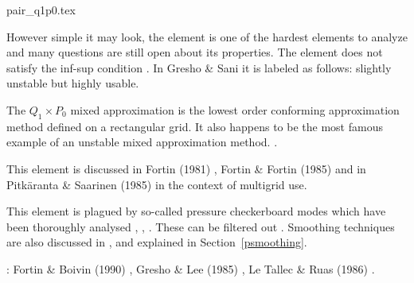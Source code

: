 \begin{flushright} {\tiny {\color{gray} pair\_q1p0.tex}} \end{flushright}


\begin{minipage}{0.48\textwidth}
\begin{center}

\end{center}
\end{minipage}
\begin{minipage}{0.48\textwidth}
\begin{center}

\end{center}
\end{minipage}

However simple it may look, the  element is 
one of the hardest elements to analyze and many questions are still open about its properties. 
The element does not satisfy the inf-sup condition \cite[p211]{hugh}. 
In Gresho \& Sani \cite{grsa} it is labeled as follows: slightly unstable but highly usable. 

The $Q_1 \times P_0$ mixed approximation is the lowest order conforming approximation 
method defined on a rectangular grid. It also happens to be the most famous example 
of an unstable mixed approximation method.
\cite[p235]{elsw}.

This element is discussed in Fortin (1981) \cite{fort81}, Fortin \& Fortin (1985) \cite{fofo85} 
and in Pitk\"aranta \& Saarinen (1985) \cite{pisa85} in the context of multigrid use.

This element is plagued by so-called pressure checkerboard modes which
have been thoroughly analysed \cite{grsi94}, \cite{chpc95}, \cite{sagl81a,sagl81b}.
These can be filtered out \cite{chpc95}. Smoothing techniques are also discussed in \cite{legs79}, 
and explained in Section~\ref{psmoothing}.

\Literature: Fortin \& Boivin (1990) \cite{fobo90}, Gresho \& Lee (1985) \cite{grle85},
Le Tallec \& Ruas (1986) \cite{leru86}.
